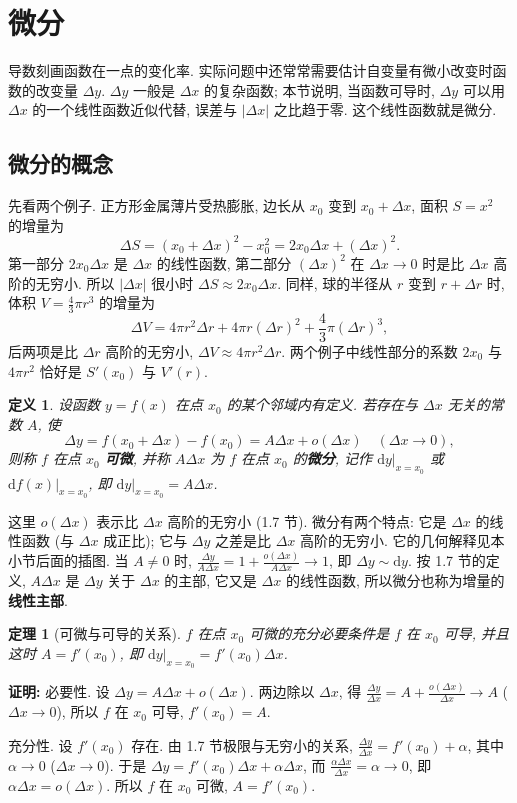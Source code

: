 \documentclass[UTF8,openany]{ctexbook}
\theoremstyle{chinesetextbook}
\newenvironment{cnproof}{\par\indent\textbf{证明:} \ignorespaces}{\par}
\newtheorem*{definitionsingle}{定义}
\newtheorem*{theoremsingle}{定理}
\newcommand{\dd}{\mathrm d}
\begin{document}
\section{微分}
导数刻画函数在一点的变化率. 实际问题中还常常需要估计自变量有微小改变时函数的改变量 $\Delta y$. $\Delta y$ 一般是 $\Delta x$ 的复杂函数; 本节说明, 当函数可导时, $\Delta y$ 可以用 $\Delta x$ 的一个线性函数近似代替, 误差与 $|\Delta x|$ 之比趋于零. 这个线性函数就是微分.
\subsection{微分的概念}
先看两个例子. 正方形金属薄片受热膨胀, 边长从 $x_0$ 变到 $x_0+\Delta x$, 面积 $S=x^2$ 的增量为
\[
\Delta S=(x_0+\Delta x)^2-x_0^2=2x_0\Delta x+(\Delta x)^2.
\]
第一部分 $2x_0\Delta x$ 是 $\Delta x$ 的线性函数, 第二部分 $(\Delta x)^2$ 在 $\Delta x\to0$ 时是比 $\Delta x$ 高阶的无穷小. 所以 $|\Delta x|$ 很小时 $\Delta S\approx2x_0\Delta x$. 同样, 球的半径从 $r$ 变到 $r+\Delta r$ 时, 体积 $\displaystyle V=\frac43\pi r^3$ 的增量为
\[
\Delta V=4\pi r^2\Delta r+4\pi r(\Delta r)^2+\frac43\pi(\Delta r)^3,
\]
后两项是比 $\Delta r$ 高阶的无穷小, $\Delta V\approx4\pi r^2\Delta r$. 两个例子中线性部分的系数 $2x_0$ 与 $4\pi r^2$ 恰好是 $S'(x_0)$ 与 $V'(r)$.
\begin{definitionsingle}
设函数 $y=f(x)$ 在点 $x_0$ 的某个邻域内有定义. 若存在与 $\Delta x$ 无关的常数 $A$, 使
\[
\Delta y=f(x_0+\Delta x)-f(x_0)=A\Delta x+o(\Delta x)\quad(\Delta x\to0),
\]
则称 $f$ 在点 $x_0$ \textbf{可微}, 并称 $A\Delta x$ 为 $f$ 在点 $x_0$ 的\textbf{微分}, 记作 $\dd y\big|_{x=x_0}$ 或 $\dd f(x)\big|_{x=x_0}$, 即 $\dd y\big|_{x=x_0}=A\Delta x$.
\end{definitionsingle}
这里 $o(\Delta x)$ 表示比 $\Delta x$ 高阶的无穷小 (1.7 节). 微分有两个特点: 它是 $\Delta x$ 的线性函数 (与 $\Delta x$ 成正比); 它与 $\Delta y$ 之差是比 $\Delta x$ 高阶的无穷小. 它的几何解释见本小节后面的插图. 当 $A\ne0$ 时, $\displaystyle\frac{\Delta y}{A\Delta x}=1+\frac{o(\Delta x)}{A\Delta x}\to1$, 即 $\Delta y\sim\dd y$. 按 1.7 节的定义, $A\Delta x$ 是 $\Delta y$ 关于 $\Delta x$ 的主部, 它又是 $\Delta x$ 的线性函数, 所以微分也称为增量的\textbf{线性主部}.
\begin{theoremsingle}[可微与可导的关系]
$f$ 在点 $x_0$ 可微的充分必要条件是 $f$ 在 $x_0$ 可导, 并且这时 $A=f'(x_0)$, 即 $\dd y\big|_{x=x_0}=f'(x_0)\Delta x$.
\end{theoremsingle}
\begin{cnproof}
必要性. 设 $\Delta y=A\Delta x+o(\Delta x)$. 两边除以 $\Delta x$, 得 $\displaystyle\frac{\Delta y}{\Delta x}=A+\frac{o(\Delta x)}{\Delta x}\to A$ ($\Delta x\to0$), 所以 $f$ 在 $x_0$ 可导, $f'(x_0)=A$.

充分性. 设 $f'(x_0)$ 存在. 由 1.7 节极限与无穷小的关系, $\displaystyle\frac{\Delta y}{\Delta x}=f'(x_0)+\alpha$, 其中 $\alpha\to0$ ($\Delta x\to0$). 于是 $\Delta y=f'(x_0)\Delta x+\alpha\Delta x$, 而 $\displaystyle\frac{\alpha\Delta x}{\Delta x}=\alpha\to0$, 即 $\alpha\Delta x=o(\Delta x)$. 所以 $f$ 在 $x_0$ 可微, $A=f'(x_0)$.
\end{cnproof}
\end{document}
